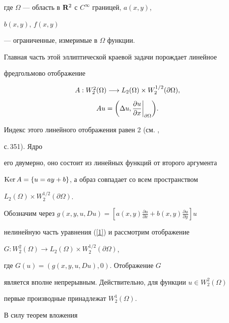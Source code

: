 где $\Omega$ --- область в ${\bold R^2}$ с $C^\infty$ границей, $a(x,y)$,


$b(x,y)$, $f(x,y)$


--- ограниченные, измеримые в $\Omega $ функции.





Главная часть этой эллиптической краевой задачи порождает линейное


фредгольмово отображение


\begin{equation}\label{A}


\begin{array}{c}


A: W^2_2(\Omega)\longrightarrow


L_2(\Omega)\times W^{1/2}_2(\partial \Omega),\\[3mm]


Au=\bigg({\Delta u,\displaystyle\fr{u}{x}\bigg|_{\partial \Omega}}\bigg).


\end{array}


\end{equation}


Индекс этого линейного отображения равен 2 (см. \cite{hermander},


с.\,351). Ядро


его двумерно, оно состоит из линейных функций от второго аргумента


$\operatorname{Ker} A=\{u=ay+b\}$, а образ совпадает со всем пространством


$L_2(\Omega)\times W^{1/2}_2(\partial \Omega)$.





Обозначим через $g(x,y,u,Du)=


[a(x,y)\frac{\partial u}{\partial x}+b(x,y)\frac{\partial u}{\partial y}]u$


нелинейную часть уравнения (\ref{1}) и рассмотрим отображение


$G : W^2_2(\Omega)\longrightarrow L_2(\Omega)


\times W^{1/2}_2(\partial \Omega)$,


где $G(u)=\left(g(x,y,u,Du),0\right)$. Отображение $G$


является вполне непрерывным. Действительно, для функции $u\in W^2_2(\Omega)$


первые производные принадлежат $W^1_2(\Omega)$.


В силу теорем вложения


